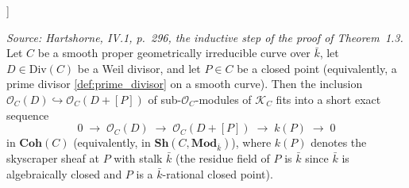 \begin{lemma}

\leanok
[Short exact sequence for \(D \rightsquigarrow D + [P]\)]
  \label{lem:sheafOf_ses_single_add}

  \textit{Source: Hartshorne, IV.1, p.~296, the inductive step of the
  proof of Theorem~1.3.}
  Let \(C\) be a smooth proper geometrically irreducible curve over
  \(\bar k\), let \(D \in \mathrm{Div}(C)\) be a Weil divisor, and let \(P \in C\) be
  a closed point (equivalently, a prime divisor
  \cref{def:prime_divisor} on a smooth curve). Then the inclusion
  \(\mathcal O_C(D) \hookrightarrow \mathcal O_C(D + [P])\) of
  sub-\(\mathcal O_C\)-modules of \(\mathcal K_C\) fits into a short exact
  sequence
  \[
    0 \;\longrightarrow\; \mathcal O_C(D)
    \;\longrightarrow\; \mathcal O_C(D + [P])
    \;\longrightarrow\; k(P)
    \;\longrightarrow\; 0
  \]
  in \(\mathbf{Coh}(C)\) (equivalently, in
  \(\mathbf{Sh}(C, \mathbf{Mod}_{\bar k})\)), where \(k(P)\) denotes the
  skyscraper sheaf at \(P\) with stalk \(\bar k\) (the residue field of \(P\)
  is \(\bar k\) since \(\bar k\) is algebraically closed and \(P\) is a
  \(\bar k\)-rational closed point).
\end{lemma}

